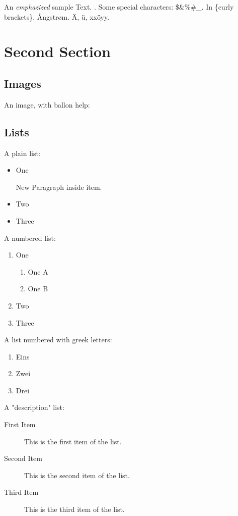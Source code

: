 \documentclass{webpage}
\begin{document}
An \emph{emphazized} sample Text. .
Some special characters: \$\&\%\#\_.
In \{curly brackets\}. {\AA}ngstr{\o}m. \"A, \"u, xx\"oyy.


\section{Second Section}

\subsection{Images}

An image, with ballon help:


\subsection{Lists}

A plain list:
\begin{itemize}[circle]
  \item One
  
  New Paragraph inside item.
  
  \item Two
  \item Three
\end{itemize}

A numbered list:
\begin{enumerate}
  \item One
  \begin{enumerate}[alph]
    \item One A
    \item One B
  \end{enumerate}
  \item Two
  \item Three
\end{enumerate}
  
A list numbered with greek letters:
\begin{enumerate}[greek]
  \item Eins
  \item Zwei
  \item Drei
\end{enumerate}

A "description" list:
\begin{description}
  \item[First Item] This is the first item of the list.
  \item[Second Item] This is the second item of the list.
  \item[Third Item] This is the third item of the list.
\end{description}
\end{document}
